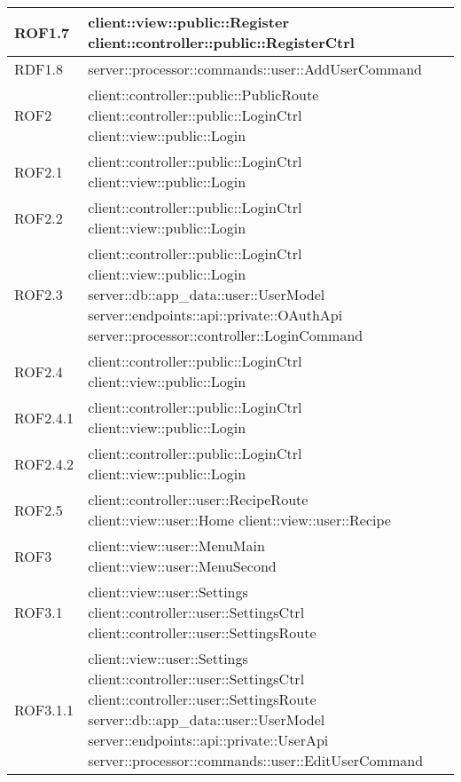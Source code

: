 \begin{center}
\begin{longtable}{| p{2.5cm} | p{11cm} |}
\hline
ROF1.7 & client::view::public::Register \newline client::controller::public::RegisterCtrl \\
\hline
RDF1.8 & server::processor::commands::user::AddUserCommand \\
\hline
ROF2 & client::controller::public::PublicRoute \newline client::controller::public::LoginCtrl \newline client::view::public::Login \\
\hline
ROF2.1 & client::controller::public::LoginCtrl \newline client::view::public::Login \\
\hline
ROF2.2 & client::controller::public::LoginCtrl \newline client::view::public::Login \\
\hline
ROF2.3 & client::controller::public::LoginCtrl \newline client::view::public::Login \newline server::db::app\_data::user::UserModel \newline server::endpoints::api::private::OAuthApi \newline server::processor::controller::LoginCommand \\
\hline
ROF2.4 & client::controller::public::LoginCtrl \newline client::view::public::Login \\
\hline
ROF2.4.1 & client::controller::public::LoginCtrl \newline client::view::public::Login \\
\hline
ROF2.4.2 & client::controller::public::LoginCtrl \newline client::view::public::Login \\
\hline
ROF2.5 & client::controller::user::RecipeRoute \newline client::view::user::Home \newline client::view::user::Recipe \\
\hline
ROF3 & client::view::user::MenuMain \newline client::view::user::MenuSecond \\
\hline
ROF3.1 & client::view::user::Settings \newline client::controller::user::SettingsCtrl \newline client::controller::user::SettingsRoute \\
\hline
ROF3.1.1 & client::view::user::Settings \newline client::controller::user::SettingsCtrl \newline client::controller::user::SettingsRoute \newline server::db::app\_data::user::UserModel \newline server::endpoints::api::private::UserApi \newline server::processor::commands::user::EditUserCommand \\

\end{longtable}
\end{center}

